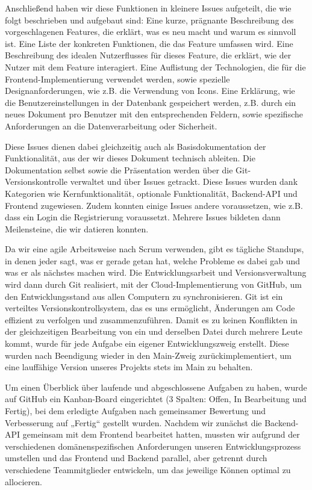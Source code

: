 \documentclass[a4paper,12pt]{article}
\begin{document}
Anschließend haben wir diese Funktionen in kleinere Issues aufgeteilt, die wie
folgt beschrieben und aufgebaut sind: Eine kurze, prägnante Beschreibung des
vorgeschlagenen Features, die erklärt, was es neu macht und warum es sinnvoll
ist. Eine Liste der konkreten Funktionen, die das Feature umfassen wird. Eine
Beschreibung des idealen Nutzerflusses für dieses Feature, die erklärt, wie der
Nutzer mit dem Feature interagiert. Eine Auflistung der Technologien, die für
die Frontend-Implementierung verwendet werden, sowie spezielle
Designanforderungen, wie z.B. die Verwendung von Icons. Eine Erklärung, wie die
Benutzereinstellungen in der Datenbank gespeichert werden, z.B. durch ein neues
Dokument pro Benutzer mit den entsprechenden Feldern, sowie spezifische
Anforderungen an die Datenverarbeitung oder Sicherheit.

Diese Issues dienen dabei gleichzeitig auch als Basisdokumentation der
Funktionalität, aus der wir dieses Dokument technisch ableiten. Die
Dokumentation selbst sowie die Präsentation werden über die
Git-Versionskontrolle verwaltet und über Issues getrackt. Diese Issues wurden
dank Kategorien wie Kernfunktionalität, optionale Funktionalität, Backend-API
und Frontend zugewiesen. Zudem konnten einige Issues andere voraussetzen, wie
z.B. dass ein Login die Registrierung voraussetzt. Mehrere Issues bildeten dann
Meilensteine, die wir datieren konnten.

Da wir eine agile Arbeitsweise nach Scrum verwenden, gibt es tägliche Standups,
in denen jeder sagt, was er gerade getan hat, welche Probleme es dabei gab und
was er als nächstes machen wird. Die Entwicklungsarbeit und Versionsverwaltung
wird dann durch Git realisiert, mit der Cloud-Implementierung von GitHub, um
den Entwicklungsstand aus allen Computern zu synchronisieren. Git ist ein
verteiltes Versionskontrollsystem, das es uns ermöglicht, Änderungen am Code
effizient zu verfolgen und zusammenzuführen. Damit es zu keinen Konflikten in
der gleichzeitigen Bearbeitung von ein und derselben Datei durch mehrere Leute
kommt, wurde für jede Aufgabe ein eigener Entwicklungszweig erstellt. Diese
wurden nach Beendigung wieder in den Main-Zweig zurückimplementiert, um eine
lauffähige Version unseres Projekts stets im Main zu behalten.

Um einen Überblick über laufende und abgeschlossene Aufgaben zu haben, wurde
auf GitHub ein Kanban-Board eingerichtet (3 Spalten: Offen, In Bearbeitung und
Fertig), bei dem erledigte Aufgaben nach gemeinsamer Bewertung und Verbesserung
auf „Fertig“ gestellt wurden. Nachdem wir zunächst die Backend-API gemeinsam
mit dem Frontend bearbeitet hatten, mussten wir aufgrund der verschiedenen
domänenspezifischen Anforderungen unseren Entwicklungsprozess umstellen und das
Frontend und Backend parallel, aber getrennt durch verschiedene Teammitglieder
entwickeln, um das jeweilige Können optimal zu allocieren.
\end{document}
